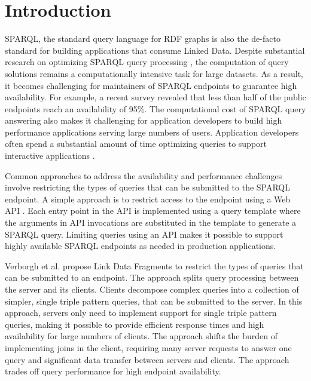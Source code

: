 \section{Introduction}
SPARQL, the standard query language for RDF graphs is also the de-facto standard for building applications that consume Linked Data. 
Despite substantial research on optimizing SPARQL query processing \cite{Pham2013}, the computation of query solutions remains a computationally intensive task for large datasets.
As a result, it becomes challenging for maintainers of SPARQL endpoints to guarantee high availability.
For example, a recent survey \cite{buil2013sparql} revealed that less than half of the public endpoints reach an availability of 95\%.
The computational cost of SPARQL query answering also makes it challenging for application developers to build high performance applications serving large numbers of users.
Application developers often spend a substantial amount of time optimizing queries to support interactive applications \cite{Loizou_Angles_Groth_2014}.

Common approaches to address the availability and performance challenges involve restricting the types of queries that can be submitted to the SPARQL endpoint.
A simple approach is to restrict access to the endpoint using a Web API \cite{Groth_Loizou_Gray_Goble_Harland_Pettifer_2014}.
Each entry point in the API is implemented using a query template where the arguments in API invocations are substituted in the template to generate a SPARQL query.
Limiting queries using an API makes it possible to support highly available SPARQL endpoints as needed in production applications.

Verborgh et al. \cite{Verborgh2014} propose Link Data Fragments to restrict the types of queries that can be submitted to an endpoint. 
The approach splits query processing between the server and its clients.
Clients decompose complex queries into a collection of simpler, single triple pattern queries, that can be submitted to the server.
In this approach, servers only need to implement support for single triple pattern queries, making it possible to provide efficient response times and high availability for large numbers of clients.
The approach shifts the burden of implementing joins in the client, requiring many server requests to answer one query and significant data transfer between servers and clients. 
The approach trades off query performance for high endpoint availability.

